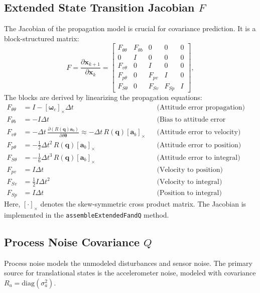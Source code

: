 \documentclass[11pt]{article}
\begin{document}
\subsection{Extended State Transition Jacobian $F$}
\label{ssec:jacobian}
The Jacobian of the propagation model is crucial for covariance prediction. It is a block-structured matrix:
\begin{equation}
F = \frac{\partial \bm{x}_{k+1}}{\partial \bm{x}_{k}} = \begin{bmatrix}
F_{\theta\theta} & F_{\theta b} & 0 & 0 & 0 \\
0 & I & 0 & 0 & 0 \\
F_{v\theta} & 0 & I & 0 & 0 \\
F_{p\theta} & 0 & F_{pv} & I & 0 \\
F_{S\theta} & 0 & F_{Sv} & F_{Sp} & I
\end{bmatrix},
\end{equation}
The blocks are derived by linearizing the propagation equations:
\begin{align}
F_{\theta\theta} &= I - [\bm{\omega}_c]_\times \Delta t && \text{(Attitude error propagation)} \\
F_{\theta b} &= -I \Delta t && \text{(Bias to attitude error coupling)} \\
F_{v\theta} &= -\Delta t \, \frac{\partial (R(\bm{q})\bm{a}_b)}{\partial \delta\bm{\theta}} \approx -\Delta t \, R(\bm{q}) [\bm{a}_b]_\times && \text{(Attitude error to velocity)} \\
F_{p\theta} &= -\tfrac{1}{2}\Delta t^2 \, R(\bm{q}) [\bm{a}_b]_\times && \text{(Attitude error to position)} \\
F_{S\theta} &= -\tfrac{1}{6}\Delta t^3 \, R(\bm{q}) [\bm{a}_b]_\times && \text{(Attitude error to integral)} \\
F_{pv} &= I \Delta t && \text{(Velocity to position)} \\
F_{Sv} &= \tfrac{1}{2} I \Delta t^2 && \text{(Velocity to integral)} \\
F_{Sp} &= I \Delta t && \text{(Position to integral)}
\end{align}
Here, $[\cdot]_\times$ denotes the skew-symmetric cross product matrix. The Jacobian is implemented in the \texttt{assembleExtendedFandQ} method.

\subsection{Process Noise Covariance $Q$}
\label{ssec:processnoise}
Process noise models the unmodeled disturbances and sensor noise. The primary source for translational states is the accelerometer noise, modeled with covariance $R_a = \text{diag}(\sigma_a^2)$.
\end{document}
